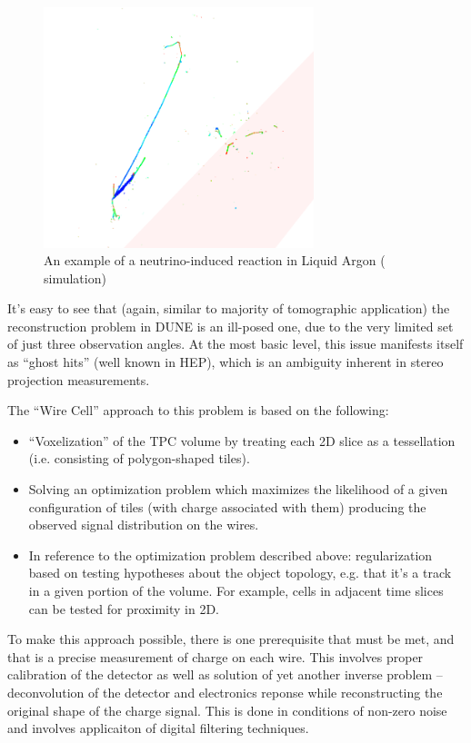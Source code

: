 \begin{figure}[h!]
	\centering
	\includegraphics[width=0.7\textwidth]{ncc-example-1.png}
	\caption{An example of a neutrino-induced reaction in Liquid Argon ( simulation)}
	\label{fig:ncc-example-1}
\end{figure}

It's easy to see that (again, similar to majority of tomographic application) the reconstruction problem in DUNE is an ill-posed one,
due to the very limited set of just three observation angles. At the most basic level, this issue
manifests itself as ``ghost hits'' (well known in HEP), which is an ambiguity inherent in stereo
projection measurements.

The ``Wire Cell'' approach to this problem is based on the following:
\begin{itemize}
\item ``Voxelization'' of the TPC volume by treating each 2D slice as a tessellation (i.e. consisting of polygon-shaped tiles).

\item Solving an optimization problem which maximizes the likelihood of a given configuration of tiles (with charge associated with them) producing the observed signal distribution on the wires.

\item In reference to the optimization problem described above: regularization based on testing hypotheses about the object topology, e.g. that it's a track in a given portion of the volume. For example, cells in adjacent time slices can be tested for proximity in 2D.
\end{itemize}

To make this approach possible, there is one prerequisite that must be met, and that is a precise measurement of charge on each wire. This involves
proper calibration of the detector as well as solution of yet another inverse problem -- deconvolution of the detector and electronics reponse while
reconstructing the original shape of the charge signal. This is done in conditions of non-zero noise and involves applicaiton of digital filtering techniques.

